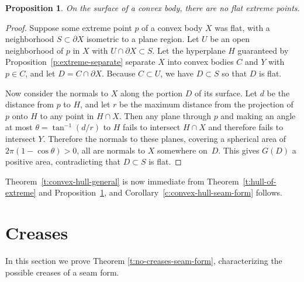 \documentclass{article}
\newtheorem{lemma}[theorem]{Lemma}
\newtheorem{proposition}[theorem]{Proposition}
\newcommand\comment[1]{}
\begin{document}
\begin{proposition}\label{p:flat-no-extreme}
  On the surface of a convex body, there are no flat extreme points.
\end{proposition}
\begin{proof}
  Suppose some extreme point $p$ of a convex body $X$ was flat,
  with a neighborhood $S \subset \partial X$ isometric to a plane region.
  Let $U$ be an open neighborhood of $p$ in $X$ with $U \cap \partial
  X \subset S$.  Let the hyperplane $H$ guaranteed by
  Proposition~\ref{p:extreme-separate} separate $X$ into convex bodies
  $C$ and $Y$ with $p \in C$, and let $D = C \cap \partial X$.  Because $C
  \subset U$, we have $D \subset S$ so that $D$ is flat.

  Now consider the normals to $X$ along the portion $D$ of its
  surface.  Let $d$ be the distance from $p$ to $H$, and let $r$ be
  the maximum distance from the projection of $p$ onto $H$ to any
  point in $H \cap X$.  Then any plane through $p$ and making an angle
  at most $\theta = \tan^{-1}(d/r)$ to $H$ fails to intersect $H \cap X$ and
  therefore fails to intersect $Y$.  Therefore the normals to these
  planes, covering a spherical area of $2\pi(1 - \cos \theta) > 0$,
  all are normals to $X$ somewhere on~$D$.  This gives $G(D)$
  a positive area, contradicting that $D \subset S$ is flat.
\end{proof}

Theorem~\ref{t:convex-hull-general} is now immediate from
Theorem~\ref{t:hull-of-extreme} and Proposition~\ref{p:flat-no-extreme},
and Corollary~\ref{c:convex-hull-seam-form} follows.



\section{Creases}
\label{sec:creases}

In this section we prove Theorem \ref{t:no-creases-seam-form},
characterizing the possible creases of a seam form.

\comment{
\begin{lemma}\label{l:gauss-map-closed}
  For a convex body $X$, the Gauss ``map'' $G$, regarded as a relation
  in $X \times S^2$, is a closed set.
\end{lemma}
\begin{proof}
  We need to show that if points $x_1, x_2, \dotsc \in X$ converge to
  $x_* \in X$, and normals $n_1, n_2, \dotsc \in S^2$ to $x_1, x_2,
  \dotsc$ respectively converge to $n_* \in S^2$, then $n_*$ is a
  normal to $x_*$.  We have $n_i \cdot x_i = \sup_{x' \in X} n_i \cdot
  x'$ for each $i$.  By continuity, $n_i \cdot x_i$ converges to $n_*
  \cdot x_*$.  Because $X$ is bounded, the functions $x' \mapsto n_i
  \cdot x'$ converge uniformly to $x' \mapsto n_* \cdot x'$, and the
  right-hand sides $\sum_{x' \in X} n_i \cdot x'$ converge to
  $\sup_{x' \in X} n_* \cdot x'$.  Consequently $n_* \cdot x_* =
  \sup_{x' \in X} n_* \cdot x'$ and $n_* \in G(x_*)$ as required.
\end{proof}
}
\end{document}

